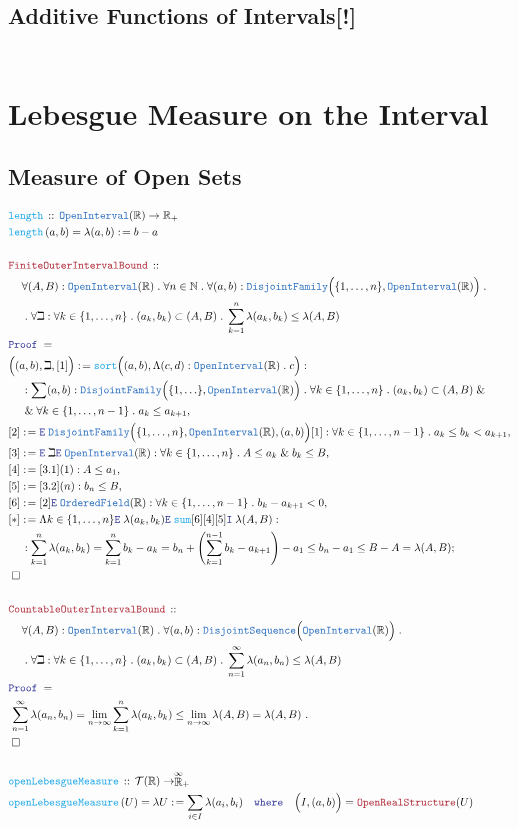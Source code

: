 \documentclass[12pt]{scrartcl}
\newcommand{\TYPE}[1]{\textcolor{NavyBlue}{\mathtt{#1}}}
\newcommand{\FUNC}[1]{\textcolor{Cerulean}{\mathtt{#1}}}
\newcommand{\LOGIC}[1]{\textcolor{Blue}{\mathtt{#1}}}
\newcommand{\THM}[1]{\textcolor{Maroon}{\mathtt{#1}}}
\renewcommand{\.}{\; . \;}
\newcommand{\de}{: \kern 0.1pc =}
\newcommand{\where}{\LOGIC{where}}
\newcommand{\Act}[1]{\left( #1 \right)}
\newcommand{\Theorem}[2]{& \THM{#1} \, :: \, #2 \\ & \Proof = \\ }
\newcommand{\DeclareFunc}[2]{& \FUNC{#1} \, :: \, #2 \\}
\newcommand{\DefineNamedFunc}[4]{&  \FUNC{#1}\Act{#2} = #3 \de #4 \\}
\newcommand{\NewLine}{\\ & \kern 1pc}
\newcommand{\Page}[1]{ \begin{align*} #1 \end{align*}   }
\renewcommand{\And}{\; \& \;}
\newcommand{\Reals}{\mathbb{R} }
\newcommand{\Nat}{\mathbb{N} }
\newcommand{\EReals}{\stackrel{\mathclap{\infty}}{\mathbb{R}}}
\newcommand{\Say}[3]{& #1 \de #2 : #3, \\}
\newcommand{\Conclude}[3]{& #1 \de #2 : #3; \\}
\newcommand{\QED}{\; \square}
\newcommand{\EndProof}{& \QED \\}
\newcommand{\Proof}{\LOGIC{Proof} \; }
\newcommand{\Elim}{\LOGIC{E} \; }
\newcommand{\Intro}{\LOGIC{I} \;}
\newcommand{\Explain}[1]{& \text{#1.} \\}
\newcommand{\T}{\mathcal{T}}
\newcommand{\OI}{\TYPE{OpenInterval}}
\begin{document}
\subsection{Additive Functions of Intervals[!] }
\Page{
}
\newpage
\section{Lebesgue Measure on the Interval}
\subsection{Measure of Open Sets}
\Page{
	\DeclareFunc{length}
	{
		\TYPE{OpenInterval}(\Reals) \to \Reals_+
	}
	\DefineNamedFunc{length}{a,b}{\lambda(a,b)}{b-a}
	\\
	\Theorem{FiniteOuterIntervalBound}
	{
		\NewLine		
		\forall (A,B) : \OI(\Reals) \.
		\forall n \in \Nat \. 
		\forall (a,b) : \TYPE{DisjointFamily}\Big( \{1,\ldots,n\}, \OI(\Reals) \Big) \. \NewLine \.
		\forall \beth : \forall k \in \{1,\ldots,n\} \. (a_k,b_k) \subset (A,B) \.
		\sum^n_{k=1} \lambda(a_k,b_k) \le \lambda(A,B) 
	}
	\Say{\Big((a,b), \beth,[1]\Big)}{\FUNC{sort}\Big( (a,b),\Lambda (c,d) : \OI(\Reals) \. c\Big)}
	{
		\NewLine :		
		\sum (a,b) : \TYPE{DisjointFamily}\Big(\{1,\ldots\}, \OI(\Reals) \Big) \.
		\forall k \in \{1,\ldots,n\} \. (a_k,b_k) \subset (A,B)
		\And \NewLine \And
		\forall k \in \{1, \ldots, n -1 \} \.  a_k \le a_{k+1}
	}
	\Say{[2]}{
		\Elim \TYPE{DisjointFamily}\Big( \{1,\ldots,n\}, \OI(\Reals), (a,b) \Big) [1]
	}{
			\forall k \in \{1, \ldots, n -1 \} \.  a_k \le b_k <  a_{k+1}
	}
	\Say{[3]}{\Elim \beth \Elim \OI(\Reals)}{ \forall k \in \{1,\ldots,n\} \. A \le a_k \And b_k \le B  }
	\Say{[4]}{[3.1](1)}{A \le a_1 }
	\Say{[5]}{[3.2](n)}{b_n \le B}
	\Say{[6]}{[2]\Elim \TYPE{OrderedField}(\Reals)}{\forall k \in \{1,\ldots,n-1\} \. b_k - a_{k+1} < 0 }
	\Conclude{[*]}{		
		\Lambda k \in \{1,\ldots,n\} \Elim \lambda(a_k,b_k) 
		\Elim \FUNC{sum}
		[6][4][5]
		\Intro \lambda(A,B)		
	}
	{
		\NewLine :		
		\sum^n_{k=1} \lambda(a_k,b_k) =
		\sum^n_{k=1} b_k - a_k = 
		b_n + \left(\sum^{n-1}_{k=1} b_{k} - a_{k+1}\right) - a_1 \le
		b_n - a_1 \le 
		B - A =
		\lambda(A,B)
	}
	\EndProof
	\\
	\Theorem{CountableOuterIntervalBound}
	{
		\NewLine		
		\forall (A,B) : \OI(\Reals) \. 
		\forall (a,b) : \TYPE{DisjointSequence}\Big(  \OI(\Reals) \Big) \. \NewLine \.
		\forall \beth : \forall k \in \{1,\ldots,n\} \. (a_k,b_k) \subset (A,B) \.
		\sum^\infty_{n=1} \lambda(a_n,b_n) \le \lambda(A,B) 
	}
	\Explain{
		$
			\sum^\infty_{n=1} \lambda(a_n,b_n) =
			\lim_{n \to \infty}\sum^n_{k=1} \lambda(a_k,b_k) \le 
			\lim_{n \to \infty} \lambda(A,B) = 
			\lambda(A,B)
		$
	}
	\EndProof
	\\
	\DeclareFunc{openLebesgueMeasure}
	{
		\T(\Reals) \to \EReals_+
	}
	\DefineNamedFunc{openLebesgueMeasure}{U}{\lambda U}
	{
		\sum_{i \in I} \lambda(a_i,b_i) \quad \where \quad \Big(I,(a,b)\Big) = \THM{OpenRealStructure}(U)
	}
}
\end{document}
